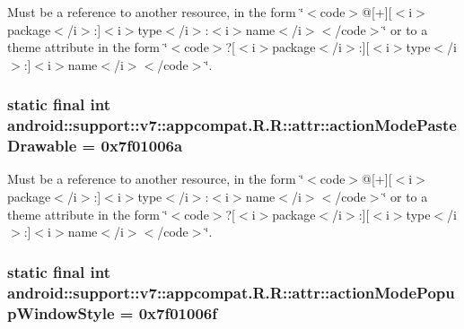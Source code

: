 Must be a reference to another resource, in the form \char`\"{}$<$code$>$@\mbox{[}+\mbox{]}\mbox{[}$<$i$>$package$<$/i$>$:\mbox{]}$<$i$>$type$<$/i$>$:$<$i$>$name$<$/i$>$$<$/code$>$\char`\"{} or to a theme attribute in the form \char`\"{}$<$code$>$?\mbox{[}$<$i$>$package$<$/i$>$:\mbox{]}\mbox{[}$<$i$>$type$<$/i$>$:\mbox{]}$<$i$>$name$<$/i$>$$<$/code$>$\char`\"{}. \hypertarget{classandroid_1_1support_1_1v7_1_1appcompat_1_1_r_1_1attr_787f9849c2c11207b892dbc96eb02722}{
\subsubsection[{actionModePasteDrawable}]{\setlength{\rightskip}{0pt plus 5cm}static final int android::support::v7::appcompat.R.R::attr::actionModePasteDrawable = 0x7f01006a}}
\label{classandroid_1_1support_1_1v7_1_1appcompat_1_1_r_1_1attr_787f9849c2c11207b892dbc96eb02722}


Must be a reference to another resource, in the form \char`\"{}$<$code$>$@\mbox{[}+\mbox{]}\mbox{[}$<$i$>$package$<$/i$>$:\mbox{]}$<$i$>$type$<$/i$>$:$<$i$>$name$<$/i$>$$<$/code$>$\char`\"{} or to a theme attribute in the form \char`\"{}$<$code$>$?\mbox{[}$<$i$>$package$<$/i$>$:\mbox{]}\mbox{[}$<$i$>$type$<$/i$>$:\mbox{]}$<$i$>$name$<$/i$>$$<$/code$>$\char`\"{}. \hypertarget{classandroid_1_1support_1_1v7_1_1appcompat_1_1_r_1_1attr_4e932490e7eba545b4df0d9ac15be8cc}{
\subsubsection[{actionModePopupWindowStyle}]{\setlength{\rightskip}{0pt plus 5cm}static final int android::support::v7::appcompat.R.R::attr::actionModePopupWindowStyle = 0x7f01006f}}
\label{classandroid_1_1support_1_1v7_1_1appcompat_1_1_r_1_1attr_4e932490e7eba545b4df0d9ac15be8cc}



